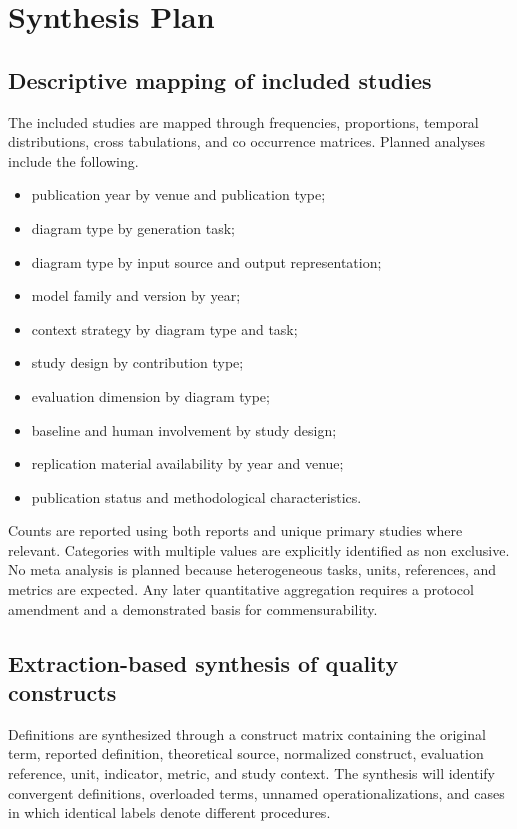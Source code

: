 \section{Synthesis Plan}
\label{sec:protocol_synthesis}

\subsection{Descriptive mapping of included studies}

The included studies are mapped through frequencies, proportions, temporal distributions, cross tabulations, and co occurrence matrices. Planned analyses include the following.

\begin{itemize}
    \item publication year by venue and publication type;
    \item diagram type by generation task;
    \item diagram type by input source and output representation;
    \item model family and version by year;
    \item context strategy by diagram type and task;
    \item study design by contribution type;
    \item evaluation dimension by diagram type;
    \item baseline and human involvement by study design;
    \item replication material availability by year and venue;
    \item publication status and methodological characteristics.
\end{itemize}

Counts are reported using both reports and unique primary studies where relevant. Categories with multiple values are explicitly identified as non exclusive. No meta analysis is planned because heterogeneous tasks, units, references, and metrics are expected. Any later quantitative aggregation requires a protocol amendment and a demonstrated basis for commensurability.

\subsection{Extraction-based synthesis of quality constructs}

Definitions are synthesized through a construct matrix containing the original term, reported definition, theoretical source, normalized construct, evaluation reference, unit, indicator, metric, and study context. The synthesis will identify convergent definitions, overloaded terms, unnamed operationalizations, and cases in which identical labels denote different procedures.

